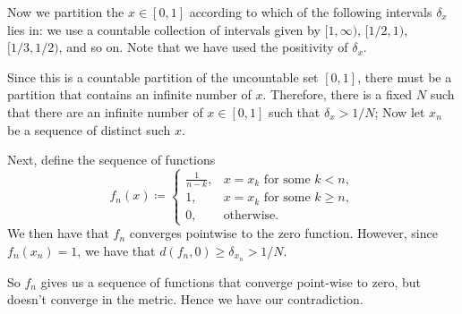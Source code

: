 Now we partition the \(x \in [0, 1]\) according to which of the following intervals \(\delta_x\) lies in: 
we use a countable collection of intervals given by \([1, \infty)\), \([1/2, 1)\), \([1/3, 1/2)\), and so on. Note
that we have used the positivity of \(\delta_x\). 

Since this is a countable partition of the uncountable set \([0, 1]\), there must be a partition that contains
an infinite number of \(x\). Therefore, there is a fixed \(N\) such that there are an infinite number of 
\(x \in [0, 1]\) such that \(\delta_x > 1/N\); Now let \(x_n\) be a sequence of distinct such \(x\).

Next, define the sequence of functions 
\begin{equation}
f_n(x) \coloneqq 
    \begin{cases}
    \frac{1}{n - k}, & x = x_k \text{ for some } k < n, \\
    1, & x = x_k \text{ for some } k\geq n, \\
    0, & \text{otherwise}. 
    \end{cases}
\end{equation} 
We then have that \(f_n\) converges pointwise to the zero function. However, since \(f_n(x_n) = 1\), we have
that \(d(f_n, 0) \geq \delta_{x_n} > 1/N\). 

So \(f_n\) gives us a sequence of functions that converge point-wise to zero, but doesn't converge in the metric.
Hence we have our contradiction.
